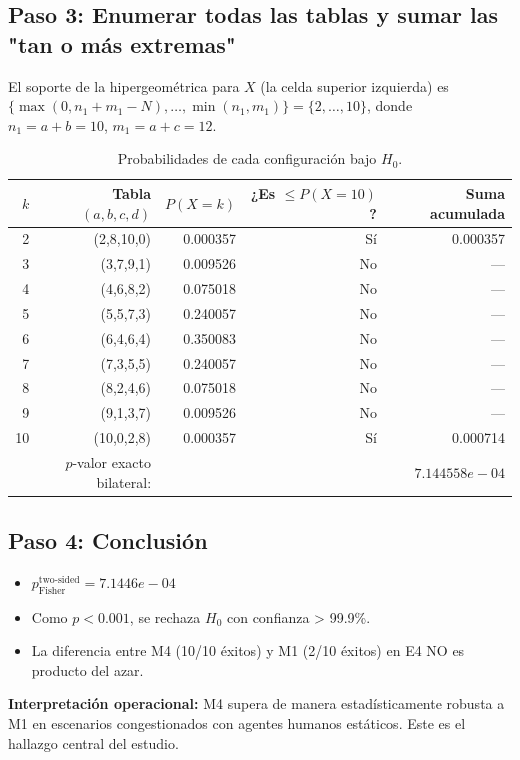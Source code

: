 \documentclass[12pt,a4paper,oneside]{book}
\begin{document}
\subsection{Paso 3: Enumerar todas las tablas y sumar las "tan o más extremas"}

El soporte de la hipergeométrica para $X$ (la celda superior izquierda) es $\{\max(0, n_1+m_1-N), \ldots, \min(n_1, m_1)\} = \{2, \ldots, 10\}$, donde $n_1 = a+b = 10$, $m_1 = a+c = 12$.

\begin{table}[H]
\centering
\caption{Probabilidades de cada configuración bajo $H_0$.}
\renewcommand{\arraystretch}{1.2}
\begin{tabular}{rrrrr}
\toprule
$k$ & Tabla $(a,b,c,d)$ & $P(X=k)$ & ¿Es $\leq P(X=10)$? & Suma acumulada \\
\midrule
2 & (2,8,10,0) & 0.000357 & Sí & 0.000357 \\
3 & (3,7,9,1) & 0.009526 & No & — \\
4 & (4,6,8,2) & 0.075018 & No & — \\
5 & (5,5,7,3) & 0.240057 & No & — \\
6 & (6,4,6,4) & 0.350083 & No & — \\
7 & (7,3,5,5) & 0.240057 & No & — \\
8 & (8,2,4,6) & 0.075018 & No & — \\
9 & (9,1,3,7) & 0.009526 & No & — \\
10 & (10,0,2,8) & 0.000357 & Sí & 0.000714 \\
\midrule
\multicolumn{2}{r}{$p$-valor exacto bilateral:} & & & $\boxed{7.144558e-04}$ \\
\bottomrule
\end{tabular}
\end{table}

\subsection{Paso 4: Conclusión}

\begin{itemize}
    \item $p_{\text{Fisher}}^{\text{two-sided}} = 7.1446e-04$
    \item Como $p < 0.001$, se rechaza $H_0$ con confianza > 99.9\%.
    \item La diferencia entre M4 (10/10 éxitos) y M1 (2/10 éxitos) en E4 NO es producto del azar.
\end{itemize}

\textbf{Interpretación operacional:} M4 supera de manera estadísticamente robusta a M1 en escenarios congestionados con agentes humanos estáticos. Este es el hallazgo central del estudio.
\end{document}
